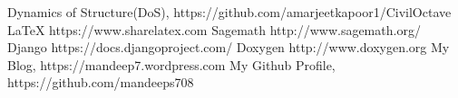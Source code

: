 \begin{thebibliography}{9}
\bibitem{} Dynamics of Structure(DoS), https://github.com/amarjeetkapoor1/CivilOctave
\bibitem{} \LaTeX{} https://www.sharelatex.com
\bibitem{} Sagemath http://www.sagemath.org/
\bibitem{} Django https://docs.djangoproject.com/
\bibitem{} Doxygen http://www.doxygen.org
\bibitem{} My Blog, https://mandeep7.wordpress.com
\bibitem{} My Github Profile, https://github.com/mandeeps708
\end{thebibliography}
